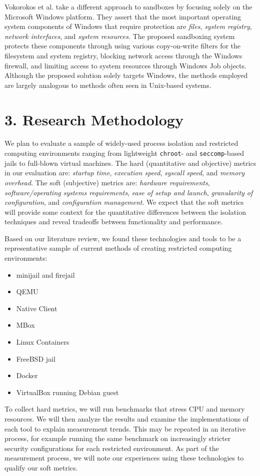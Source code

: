 \documentclass{proc}
\begin{document}
Vokorokos et al. \cite{vokorokos2015sandboxMSWIN} take a different approach to sandboxes by focusing solely on the Microsoft Windows platform. They assert that the most important operating system components of Windows that require protection are \textit{files}, \textit{system registry}, \textit{network interfaces}, and \textit{system resources}. The proposed sandboxing system protects these components through using various copy-on-write filters for the filesystem and system registry, blocking network access through the Windows firewall, and limiting access to system resources through Windows Job objects. Although the proposed solution solely targets Windows, the methods employed are largely analogous to methods often seen in Unix-based systems.

\section*{3. Research Methodology}
We plan to evaluate a sample of widely-used process isolation and restricted computing environments ranging from lightweight \texttt{chroot}- and \texttt{seccomp}-based jails to full-blown virtual machines. The hard (quantitative and objective) metrics in our evaluation are: \textit{startup time}, \textit{execution speed}, \textit{syscall speed}, and \textit{memory overhead}. The soft (subjective) metrics are: \textit{hardware requirements}, \textit{software/operating systems requirements}, \textit{ease of setup and launch}, \textit{granularity of configuration}, and \textit{configuration management}. We expect that the soft metrics will provide some context for the quantitative differences between the isolation techniques and reveal tradeoffs between functionality and performance.

Based on our literature review, we found these technologies and tools to be a representative sample of current methods of creating restricted computing environments:\vspace{0.5em}
{\small
\begin{itemize}
\item minijail and firejail
\item QEMU
\item Native Client
\item MBox
\item Linux Containers
\item FreeBSD jail
\item Docker
\item VirtualBox running Debian guest
\end{itemize}
}
To collect hard metrics, we will run benchmarks that stress CPU and memory resources. We will then analyze the results and examine the implementations of each tool to explain measurement trends. This may be repeated in an iterative process, for example running the same benchmark on increasingly stricter security configurations for each restricted environment. As part of the measurement process, we will note our experiences using these technologies to qualify our soft metrics.
\end{document}
